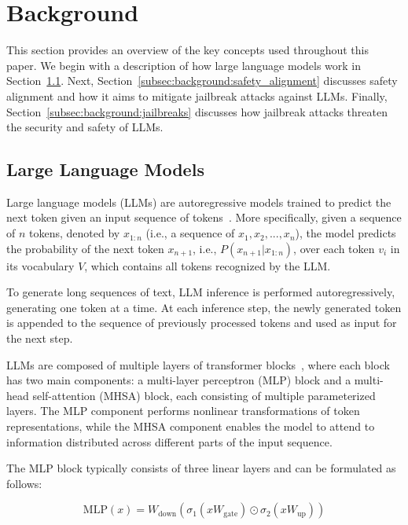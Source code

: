 \section{Background}
\label{sec:background}
This section provides an overview of the key concepts used throughout this paper. We begin with a description of how large language models work in Section~\ref{subsec:background:llms}. Next, Section~\ref{subsec:background:safety_alignment} discusses safety alignment and how it aims to mitigate jailbreak attacks against LLMs. Finally, Section~\ref{subsec:background:jailbreaks} discusses how jailbreak attacks threaten the security and safety of LLMs.


\subsection{Large Language Models}
\label{subsec:background:llms}
Large language models (LLMs) are autoregressive models trained to predict the next token given an input sequence of tokens~\cite{brown2020fewshotlearners}. More specifically, given a sequence of $n$ tokens, denoted by $x_{1:n}$ (i.e., a sequence of $x_1, x_2,...,x_n$), the model predicts the probability of the next token $x_{n+1}$, i.e., $P(x_{n+1}|x_{1:n})$, over each token $v_i$ in its vocabulary $V$, which contains all tokens recognized by the LLM.

To generate long sequences of text, LLM inference is performed autoregressively, generating one token at a time. At each inference step, the newly generated token is appended to the sequence of previously processed tokens and used as input for the next step.

LLMs are composed of multiple layers of transformer blocks~\cite{attention}, where each block has two main components: a multi-layer perceptron (MLP) block and a multi-head self-attention (MHSA) block, each consisting of multiple parameterized layers. The MLP component performs nonlinear transformations of token representations, while the MHSA component enables the model to attend to information distributed across different parts of the input sequence.

The MLP block typically consists of three linear layers and can be formulated as follows:

\begin{equation*}
    \text{MLP}(x) = W_\text{down} \left(\sigma_1\left(xW_\text{gate}\right) \odot \sigma_2\left(xW_\text{up}\right) \right)
\end{equation*}

